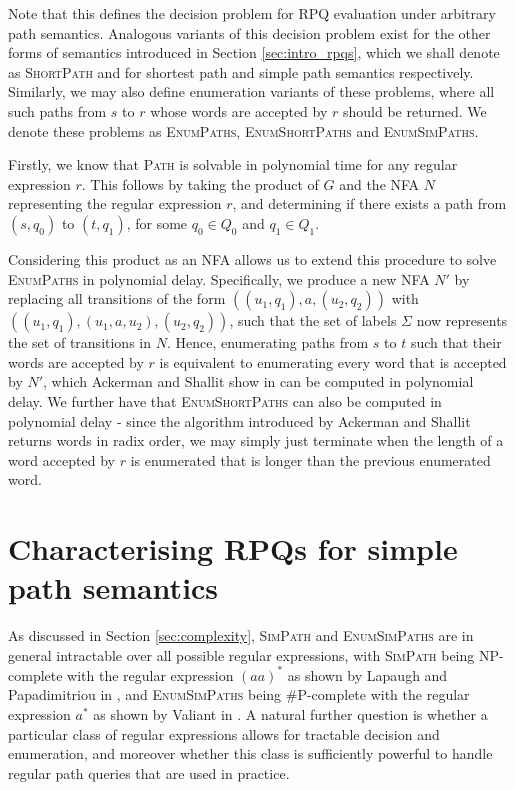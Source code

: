 \documentclass{article}
\begin{document}
Note that this defines the decision problem for RPQ evaluation under arbitrary path semantics. Analogous variants of this decision problem exist for the other forms of semantics introduced in Section \ref{sec:intro_rpqs}, which we shall denote as \textsc{ShortPath} and  for shortest path and simple path semantics respectively. Similarly, we may also define enumeration variants of these problems, where all such paths from $s$ to $r$ whose words are accepted by $r$ should be returned. We denote these problems as \textsc{EnumPaths}, \textsc{EnumShortPaths} and \textsc{EnumSimPaths}.

Firstly, we know that \textsc{Path} is solvable in polynomial time for any regular expression $r$. This follows by taking the product of $G$ and the NFA $N$ representing the regular expression $r$, and determining if there exists a path from $(s, q_0)$ to $(t, q_1)$, for some $q_0 \in Q_0$ and $q_1 \in Q_1$.

Considering this product as an NFA allows us to extend this procedure to solve \textsc{EnumPaths} in polynomial delay. Specifically, we produce a new NFA $N'$ by replacing all transitions of the form $((u_1, q_1), a, (u_2, q_2))$ with $((u_1, q_1), (u_1, a, u_2), (u_2, q_2))$, such that the set of labels $\Sigma$ now represents the set of transitions in $N$. Hence, enumerating paths from $s$ to $t$ such that their words are accepted by $r$ is equivalent to enumerating every word that is accepted by $N'$, which Ackerman and Shallit show in \cite{ackermanEfficientEnumerationWords2009} can be computed in polynomial delay. We further have that \textsc{EnumShortPaths} can also be computed in polynomial delay - since the algorithm introduced by Ackerman and Shallit returns words in radix order, we may simply just terminate when the length of a word accepted by $r$ is enumerated that is longer than the previous enumerated word.


\section{Characterising RPQs for simple path semantics}
\label{sec:simple_characterisation}

As discussed in Section \ref{sec:complexity}, \textsc{SimPath} and \textsc{EnumSimPaths} are in general intractable over all possible regular expressions, with \textsc{SimPath} being NP-complete with the regular expression $(aa)^*$ as shown by Lapaugh and Papadimitriou in \cite{lapaughEvenpathProblemGraphs1984}, and \textsc{EnumSimPaths} being \#P-complete with the regular expression $a^*$ as shown by Valiant in \cite{valiantComplexityComputingPermanent1979}. A natural further question is whether a particular class of regular expressions allows for tractable decision and enumeration, and moreover whether this class is sufficiently powerful to handle regular path queries that are used in practice.
\end{document}

